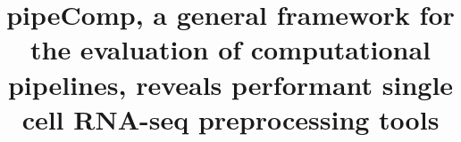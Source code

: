 \documentclass{bmcart}
\begin{document}
\begin{frontmatter}

\begin{fmbox}


\title{pipeComp, a general framework for the evaluation of computational pipelines, reveals performant single cell RNA-seq preprocessing tools}


\author[
   addressref={aff1,aff2},          %
   email={pierre-luc.germain@hest.ethz.ch}   %
]{ }
\author[
   addressref={aff1},
    email={anthony.sonrel@uzh.ch}
]{ }
\author[
   addressref={aff1},
   corref={aff1},  %
   email={mark.robinson@imls.uzh.ch}
]{ }


\address[id=aff1]{
  , %
  ,
  ,
}
\address[id=aff2]{
  ,
  ,
  ,
}


\end{fmbox}
\end{frontmatter}
\end{document}
